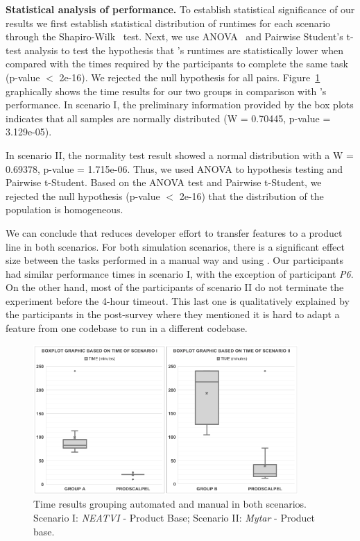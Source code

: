 \textbf{Statistical analysis of performance.} 
To establish statistical significance of our results we first establish statistical distribution of runtimes for each scenario through the Shapiro-Wilk~\cite{SHAPIRO1965} test. 
Next, we use ANOVA~\cite{Gelman2005} and Pairwise Student’s t-test analysis to test the hypothesis that \prodscalpel's runtimes are statistically lower when compared with the times required by the participants to complete the same task (p-value $<$ 2e-16). We rejected the null hypothesis for all pairs. Figure~\ref{fig:experiment_result_boxplot} graphically shows the time results for our two groups in comparison with \prodscalpel's performance. In scenario I, the preliminary information provided by the box plots indicates that all samples are normally distributed (W = 0.70445, p-value = 3.129e-05).

In scenario II, the normality test result showed a normal distribution with a W = 0.69378, p-value = 1.715e-06. Thus, we used ANOVA to hypothesis testing and Pairwise t-Student. Based on the ANOVA test and Pairwise t-Student, we rejected the null hypothesis (p-value $<$ 2e-16) that the distribution of the population is homogeneous.

We can conclude that \prodscalpel reduces developer effort to transfer features to a product line in both scenarios. For both simulation scenarios, there is a significant effect size between the tasks performed in a manual way and using \prodscalpel. 
Our participants had similar performance times in scenario I, with the exception of participant \emph{P6}. On the other hand, most of the participants of scenario II do not terminate the experiment before the 4-hour timeout. This last one is qualitatively explained by the participants in the post-survey where they mentioned it is hard to adapt a feature from one codebase to run in a different codebase. 
 
\begin{figure}[t]
	\centering \includegraphics[width=0.9\textwidth]{images/experiment_time_results.png}
	\centering 
	\caption{Time results grouping automated and manual in both scenarios.  Scenario I: \emph{NEATVI} - Product Base; Scenario II: \emph{Mytar} - Product base.}
	\label{fig:experiment_result_boxplot}
\end{figure} 

